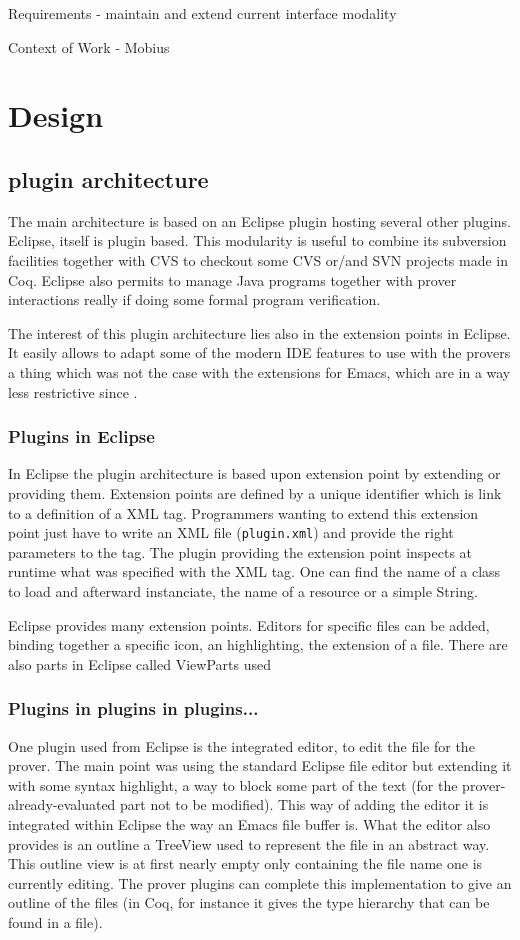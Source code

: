 \documentclass{entcs}
\begin{document}
Requirements - maintain and extend current interface modality

Context of Work - Mobius

\section{Design}

\subsection{plugin architecture}
The main architecture is based on an Eclipse plugin hosting several other
plugins. Eclipse, itself is plugin based. This modularity is useful to 
combine its subversion facilities together with CVS to checkout some 
CVS or/and SVN projects made in Coq. Eclipse also permits to manage 
Java programs together with prover interactions really 
if doing some formal program verification.

The interest of this plugin architecture lies also in the extension points 
 in Eclipse. It easily allows to adapt some of the modern 
IDE features to use with the provers a thing which was not the case
with the extensions for Emacs, which are in a way less restrictive
since .
\subsubsection{Plugins in Eclipse}
In Eclipse the plugin architecture is based upon extension point by
extending or providing them. 
Extension points are defined by a unique identifier which is link
to a definition of a XML tag. Programmers wanting to extend
this extension point just have to write an XML file ({\tt plugin.xml}) 
and provide the right parameters to the tag.
The plugin providing the extension point inspects at runtime what was 
specified with the XML tag. One can find the name of a class to load
and afterward instanciate, the name of a resource or a simple String.

Eclipse provides many extension points. Editors for specific files can be
added, binding together a specific icon, an highlighting, the extension of a
file. There are also parts in Eclipse called ViewParts used
\subsubsection{Plugins in plugins in plugins...}
One plugin used from Eclipse is the integrated editor, to edit the 
file for the prover. The main point was using the standard Eclipse file editor
but extending it with some syntax highlight, a way to block some part
of the text (for the prover-already-evaluated part not to be modified). This
way of adding the editor it is integrated within Eclipse the way an Emacs 
file buffer is.  What the editor also provides is an outline a TreeView
used to represent the file in an abstract way. This outline view
is at first nearly empty only containing the file name one is currently
editing. The prover plugins can complete this implementation to give
an outline of the files (in Coq, for instance it gives the type
hierarchy that can be found in a file).
\end{document}
